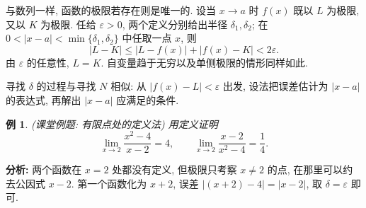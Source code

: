 \documentclass[UTF8,openany]{ctexbook}
\theoremstyle{chinesetextbook}
\newtheorem{example}{例}[section]
\begin{document}
与数列一样, 函数的极限若存在则是唯一的. 设当 $x\to a$ 时 $f(x)$ 既以 $L$ 为极限, 又以 $K$ 为极限. 任给 $\varepsilon>0$, 两个定义分别给出半径 $\delta_1,\delta_2$; 在 $0<|x-a|<\min\{\delta_1,\delta_2\}$ 中任取一点 $x$, 则
\[
|L-K|\le|L-f(x)|+|f(x)-K|<2\varepsilon.
\]
由 $\varepsilon$ 的任意性, $L=K$. 自变量趋于无穷以及单侧极限的情形同样如此.

寻找 $\delta$ 的过程与寻找 $N$ 相似: 从 $|f(x)-L|<\varepsilon$ 出发, 设法把误差估计为 $|x-a|$ 的表达式, 再解出 $|x-a|$ 应满足的条件.
\begin{example}
\textnormal{(课堂例题: 有限点处的定义法)} 用定义证明
\[
\lim_{x\to2}\frac{x^2-4}{x-2}=4,\qquad\lim_{x\to2}\frac{x-2}{x^2-4}=\frac14.
\]
\end{example}
\par\indent\textbf{分析:} 两个函数在 $x=2$ 处都没有定义, 但极限只考察 $x\ne2$ 的点, 在那里可以约去公因式 $x-2$. 第一个函数化为 $x+2$, 误差 $|(x+2)-4|=|x-2|$, 取 $\delta=\varepsilon$ 即可.
\end{document}
